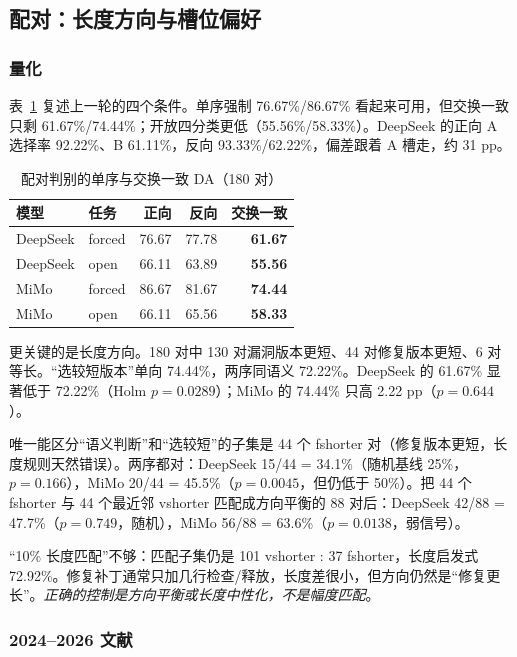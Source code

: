 \documentclass[conference]{IEEEtran}
\newcommand{\best}[1]{\textbf{#1}}
\begin{document}
\subsection{配对：长度方向与槽位偏好}
\label{sec:gap-pair}

\subsubsection{量化}

表~\ref{tab:pairbase} 复述上一轮的四个条件。单序强制 76.67\%/86.67\% 看起来可用，但交换一致只剩 61.67\%/74.44\%；开放四分类更低（55.56\%/58.33\%）。DeepSeek 的正向 A 选择率 92.22\%、B 61.11\%，反向 93.33\%/62.22\%，偏差跟着 A 槽走，约 31 pp。

\begin{table}[t]
\centering
\caption{配对判别的单序与交换一致 DA（180 对）}
\label{tab:pairbase}
\footnotesize
\setlength{\tabcolsep}{3pt}
\begin{tabular}{@{}llrrr@{}}
\toprule
模型 & 任务 & 正向 & 反向 & 交换一致 \\
\midrule
DeepSeek & forced & 76.67 & 77.78 & \best{61.67} \\
DeepSeek & open & 66.11 & 63.89 & \best{55.56} \\
MiMo & forced & 86.67 & 81.67 & \best{74.44} \\
MiMo & open & 66.11 & 65.56 & \best{58.33} \\
\bottomrule
\end{tabular}
\end{table}

更关键的是长度方向。180 对中 130 对漏洞版本更短、44 对修复版本更短、6 对等长。“选较短版本”单向 74.44\%，两序同语义 72.22\%。DeepSeek 的 61.67\% 显著低于 72.22\%（Holm $p=0.0289$）；MiMo 的 74.44\% 只高 2.22 pp（$p=0.644$）。

唯一能区分“语义判断”和“选较短”的子集是 44 个 fshorter 对（修复版本更短，长度规则天然错误）。两序都对：DeepSeek 15/44 = 34.1\%（随机基线 25\%，$p=0.166$），MiMo 20/44 = 45.5\%（$p=0.0045$，但仍低于 50\%）。把 44 个 fshorter 与 44 个最近邻 vshorter 匹配成方向平衡的 88 对后：DeepSeek 42/88 = 47.7\%（$p=0.749$，随机），MiMo 56/88 = 63.6\%（$p=0.0138$，弱信号）。

“10\% 长度匹配”不够：匹配子集仍是 101 vshorter : 37 fshorter，长度启发式 72.92\%。修复补丁通常只加几行检查/释放，长度差很小，但方向仍然是“修复更长”。\emph{正确的控制是方向平衡或长度中性化，不是幅度匹配}。

\subsubsection{2024--2026 文献}
\end{document}
